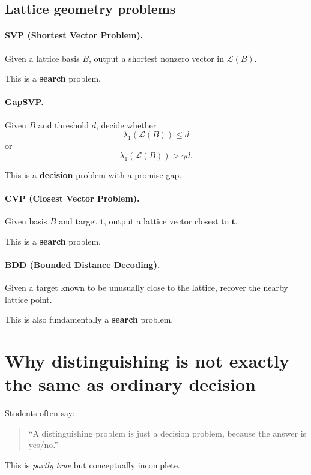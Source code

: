 \documentclass[11pt]{article}
\begin{document}
	\subsection{Lattice geometry problems}
	
	\paragraph{SVP (Shortest Vector Problem).}
	Given a lattice basis $B$, output a shortest nonzero vector in $\mathcal{L}(B)$.
	
	This is a \textbf{search} problem.
	
	\paragraph{GapSVP.}
	Given $B$ and threshold $d$, decide whether
	\[
	\lambda_1(\mathcal{L}(B)) \le d
	\]
	or
	\[
	\lambda_1(\mathcal{L}(B)) > \gamma d.
	\]
	
	This is a \textbf{decision} problem with a promise gap.
	
	\paragraph{CVP (Closest Vector Problem).}
	Given basis $B$ and target $\bm t$, output a lattice vector closest to $\bm t$.
	
	This is a \textbf{search} problem.
	
	\paragraph{BDD (Bounded Distance Decoding).}
	Given a target known to be unusually close to the lattice, recover the nearby lattice point.
	
	This is also fundamentally a \textbf{search} problem.
	
	\section{Why distinguishing is not exactly the same as ordinary decision}
	
	Students often say:
	
	\begin{quote}
		``A distinguishing problem is just a decision problem, because the answer is yes/no.''
	\end{quote}
	
	This is \emph{partly true} but conceptually incomplete.
	
\end{document}
